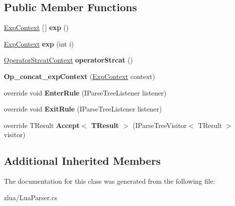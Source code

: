 \subsection*{Public Member Functions}
\begin{DoxyCompactItemize}
\item 
\mbox{\label{classzlua_1_1_lua_parser_1_1_op__concat__exp_context_a2f2dd33de32c86b844fd6711381a203e}} 
\mbox{\hyperlink{classzlua_1_1_lua_parser_1_1_exp_context}{Exp\+Context}} \mbox{[}$\,$\mbox{]} {\bfseries exp} ()
\item 
\mbox{\label{classzlua_1_1_lua_parser_1_1_op__concat__exp_context_af236acb9cdc7e64a1bef3d32a46ae076}} 
\mbox{\hyperlink{classzlua_1_1_lua_parser_1_1_exp_context}{Exp\+Context}} {\bfseries exp} (int i)
\item 
\mbox{\label{classzlua_1_1_lua_parser_1_1_op__concat__exp_context_a58fe6d968546a2725d357cec4f16a9dd}} 
\mbox{\hyperlink{classzlua_1_1_lua_parser_1_1_operator_strcat_context}{Operator\+Strcat\+Context}} {\bfseries operator\+Strcat} ()
\item 
\mbox{\label{classzlua_1_1_lua_parser_1_1_op__concat__exp_context_a6956479203fcf33f9b5721af06fe4f53}} 
{\bfseries Op\+\_\+concat\+\_\+exp\+Context} (\mbox{\hyperlink{classzlua_1_1_lua_parser_1_1_exp_context}{Exp\+Context}} context)
\item 
\mbox{\label{classzlua_1_1_lua_parser_1_1_op__concat__exp_context_a866001b55dec0181796b1d25f1379b85}} 
override void {\bfseries Enter\+Rule} (I\+Parse\+Tree\+Listener listener)
\item 
\mbox{\label{classzlua_1_1_lua_parser_1_1_op__concat__exp_context_a2926bcc328f8bee64d370bff4632256c}} 
override void {\bfseries Exit\+Rule} (I\+Parse\+Tree\+Listener listener)
\item 
\mbox{\label{classzlua_1_1_lua_parser_1_1_op__concat__exp_context_a7b35a51b61568a37bbccea84ae829693}} 
override T\+Result {\bfseries Accept$<$ T\+Result $>$} (I\+Parse\+Tree\+Visitor$<$ T\+Result $>$ visitor)
\end{DoxyCompactItemize}
\subsection*{Additional Inherited Members}


The documentation for this class was generated from the following file\+:\begin{DoxyCompactItemize}
\item 
zlua/Lua\+Parser.\+cs\end{DoxyCompactItemize}
